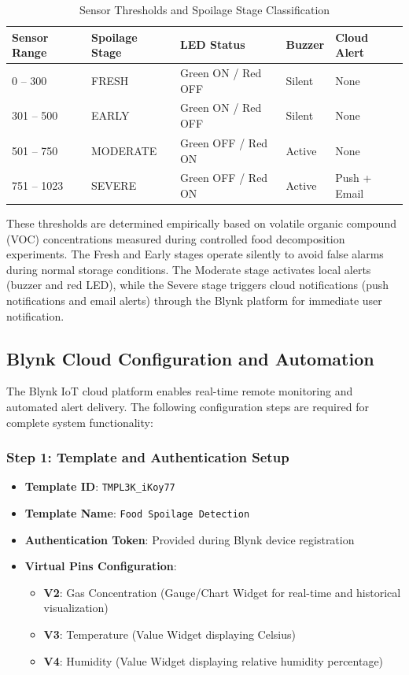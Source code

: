 \begin{table}[H]
	\centering
	\caption{Sensor Thresholds and Spoilage Stage Classification}
	\label{tab:sensor_thresholds}
	\begin{tabular}{|l|l|l|l|l|}
		\hline
		\textbf{Sensor Range} & \textbf{Spoilage Stage} & \textbf{LED Status} & \textbf{Buzzer} & \textbf{Cloud Alert} \\ \hline
		0 – 300 & FRESH & Green ON / Red OFF & Silent & None \\ \hline
		301 – 500 & EARLY & Green ON / Red OFF & Silent & None \\ \hline
		501 – 750 & MODERATE & Green OFF / Red ON & Active & None \\ \hline
		751 – 1023 & SEVERE & Green OFF / Red ON & Active & Push + Email \\ \hline
	\end{tabular}
\end{table}

These thresholds are determined empirically based on volatile organic compound (VOC) concentrations measured during controlled food decomposition experiments. The Fresh and Early stages operate silently to avoid false alarms during normal storage conditions. The Moderate stage activates local alerts (buzzer and red LED), while the Severe stage triggers cloud notifications (push notifications and email alerts) through the Blynk platform for immediate user notification.

\subsection{Blynk Cloud Configuration and Automation}
The Blynk IoT cloud platform enables real-time remote monitoring and automated alert delivery. The following configuration steps are required for complete system functionality:

\subsubsection{Step 1: Template and Authentication Setup}
\begin{itemize}
    \item \textbf{Template ID}: \texttt{TMPL3K\_iKoy77}
    \item \textbf{Template Name}: \texttt{Food Spoilage Detection}
    \item \textbf{Authentication Token}: Provided during Blynk device registration
    \item \textbf{Virtual Pins Configuration}:
    \begin{itemize}
        \item \textbf{V2}: Gas Concentration (Gauge/Chart Widget for real-time and historical visualization)
        \item \textbf{V3}: Temperature (Value Widget displaying Celsius)
        \item \textbf{V4}: Humidity (Value Widget displaying relative humidity percentage)
    \end{itemize}
\end{itemize}

